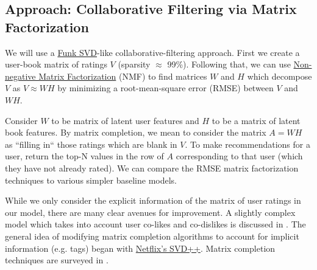 \documentclass[11pt]{article}
\begin{document}
    
    
    \hypertarget{approach}{%
\subsection{Approach: Collaborative Filtering via Matrix Factorization}}

We will use a \href{https://en.wikipedia.org/wiki/Matrix_factorization_(recommender_systems)#Funk_SVD}{Funk SVD}-like collaborative-filtering approach.
First we create a user-book matrix of ratings $V$ (sparsity $\approx$ 99\%). 
Following that, we can use \href{http://scikit-learn.org/stable/modules/generated/sklearn.decomposition.NMF.html}{Non-negative Matrix Factorization} (NMF) to find matrices $W$ and $H$ which decompose $V$ as $V \approx WH$ by minimizing a root-mean-square error (RMSE) between $V$ and $WH$.

Consider $W$ to be matrix of latent user features and $H$ to be a matrix of latent book features. By matrix completion, we mean to consider the matrix $A = WH$ as ``filling in`` those ratings which are blank in $V$.
To make recommendations for a user, return the top-N values in the row of $A$ corresponding to that user (which they have not already rated). We can compare the RMSE matrix factorization techniques to various simpler baseline models.

While we only consider the explicit information of the matrix of user ratings in our model, there are many clear avenues for improvement. A slightly complex model which takes into account user co-likes and co-dislikes is discussed in \cite{tranRegularizingMatrixFactorization2018}. The general idea of modifying matrix completion algorithms to account for implicit information (e.g. tags) began with \href{https://en.wikipedia.org/wiki/Matrix_factorization_(recommender_systems)#SVD++}{Netflix's SVD++}. Matrix completion techniques are surveyed in \cite{ramlatchanSurveyMatrixCompletion2018}.

\end{document}
